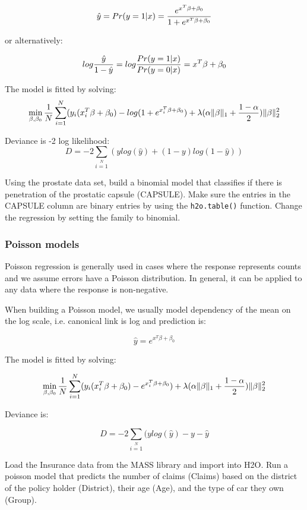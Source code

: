 \[ \hat{y} = Pr(y = 1|x) = {e^{x^T\beta + \beta_0} \over 1 + e^{x^T \beta + \beta_0} } \]

or alternatively:

\[log {\hat{y} \over 1- \hat{y}} = log{Pr(y=1|x) \over Pr(y=0|x)} = x^T \beta + \beta_0\]

The model is fitted by solving:
\[  \min\limits_{\beta,\beta_0} { {1 \over N}\sum\limits_{i=1}\limits^{N}(y_i (x_i^{T}\beta  + \beta_0) - log (1 + e^{x_i^{T}\beta  + \beta_0} )  + \lambda (\alpha \|\beta \|_1 + {1-\alpha \over 2}) \| \beta \|_2^2} \]

Deviance is -2 log likelihood:
\[D = -2\sum\limits_{i=1}\limits^{N}{(y log(\hat{y}) + (1 - y)log(1-\hat{y})  )}\]

\waterExampleInR

Using the prostate data set, build a binomial model that classifies if there is penetration of the prostatic
capsule (CAPSULE). Make sure the entries in the CAPSULE column are binary entries by using the \texttt{h2o.table()}
function. Change the regression by setting the family to binomial.



\subsubsection{Poisson models}
Poisson regression is generally used in cases where the response represents counts and we assume errors have a
Poisson distribution. In general, it can be applied to any data where the response is non-negative.

When building a Poisson model, we usually model dependency of the mean on the log scale, i.e. canonical link is log
and prediction is:

\[\hat{y} = e^{x^T\beta + \beta_0}\]

The model is fitted by solving:

\[  \min\limits_{\beta,\beta_0} { {1 \over N}\sum\limits_{i=1}\limits^{N}(y_i (x_i^{T}\beta  + \beta_0) - e^{x_i^{T}\beta  + \beta_0})  + \lambda (\alpha \|\beta \|_1 + {1-\alpha \over 2}) \| \beta \|_2^2} \]

Deviance is:

\[D = -2\sum\limits_{i=1}\limits^{N}{(y log(\hat{y}) - y - \hat{y}}\]

\waterExampleInR

Load the Insurance data from the MASS library and import into H2O. Run a poisson model that predicts the number of
claims (Claims) based on the district of the policy holder (District), their age (Age), and the type of car they
own (Group).

